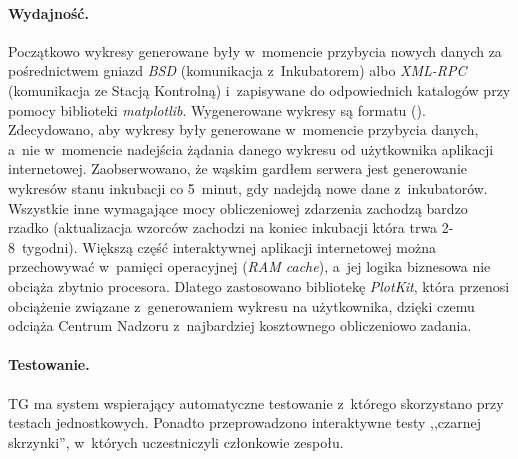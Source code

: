 \paragraph{Wydajność.}
Początkowo wykresy generowane były w~momencie przybycia nowych danych za
pośrednictwem gniazd \emph{BSD} (komunikacja z~Inkubatorem) albo \emph{XML-RPC}
(komunikacja ze Stacją Kontrolną) i~zapisywane do odpowiednich katalogów przy
pomocy biblioteki \emph{matplotlib}. Wygenerowane wykresy są formatu
 (). Zdecydowano, aby wykresy
były generowane w~momencie przybycia danych, a~nie w~momencie nadejścia żądania
danego wykresu od użytkownika aplikacji internetowej.  Zaobserwowano, że wąskim
gardłem serwera jest generowanie wykresów stanu inkubacji co 5~minut, gdy
nadejdą nowe dane z~inkubatorów. Wszystkie inne wymagające mocy obliczeniowej
zdarzenia zachodzą bardzo rzadko (aktualizacja wzorców zachodzi na koniec
inkubacji która trwa 2-8~tygodni). Większą część interaktywnej aplikacji
internetowej można przechowywać w~pamięci operacyjnej (\emph{RAM cache}), a~jej
logika biznesowa nie obciąża zbytnio procesora.  Dlatego zastosowano bibliotekę
\emph{PlotKit}, która przenosi obciążenie związane z~generowaniem wykresu na
użytkownika, dzięki czemu odciąża Centrum Nadzoru z~najbardziej kosztownego
obliczeniowo zadania.

\paragraph{Testowanie.}
TG ma system wspierający automatyczne testowanie z~którego skorzystano przy
testach jednostkowych. Ponadto przeprowadzono interaktywne testy ,,czarnej
skrzynki'', w~których uczestniczyli członkowie zespołu.


